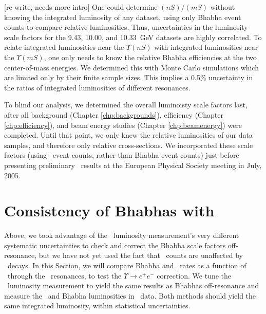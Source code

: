 \documentclass{cornell}
\begin{document}
[re-write, needs more intro] One could determine \gee$(nS)$/\gee$(mS)$
without knowing the integrated luminosity of any dataset, using only
Bhabha event counts to compare relative luminosities.  Thus,
uncertainties in the luminosity scale factors for the 9.43, 10.00, and
10.33~GeV datasets are highly correlated.  To relate integrated
luminosities near the $\Upsilon(nS)$ with integrated luminosities near
the $\Upsilon(mS)$, one only needs to know the relative Bhabha
efficiencies at the two center-of-mass energies.  We determined this
with Monte Carlo simulations which are limited only by their finite
sample sizes.  This implies a 0.5\% uncertainty in the ratios of
integrated luminosities of different resonances.

To blind our analysis, we determined the overall luminoisty scale
factors last, after all background (Chapter \ref{chp:backgrounds}),
efficiency (Chapter \ref{chp:efficiency}), and beam energy studies
(Chapter \ref{chp:beamenergy}) were completed.  Until that point, we
only knew the relative luminosities of our data samples, and therefore
only relative cross-sections.  We incorporated these scale factors
(using \gamgam\ event counts, rather than Bhabha event counts) just
before presenting preliminary \gee\ results at the European Physical
Society meeting in July, 2005.

\section{Consistency of Bhabhas with \boldmath \gamgam}

Above, we took advantage of the \gamgam\ luminosity measurement's very
different systematic uncertainties to check and correct the Bhabha
scale factors off-resonance, but we have not yet used the fact that
\gamgam\ counts are unaffected by \ups\ decays.  In this Section, we
will compare Bhabha and \gamgam\ rates as a function of \ecm\ through
the \ups\ resonances, to test the $\Upsilon \to e^+e^-$ correction.
We tune the \gamgam\ luminosity measurement to yield the same results
as Bhabhas off-resonance and measure the \gamgam\ and Bhabha
luminosities in \ups\ data.  Both methods should yield the same
integrated luminosity, within statistical uncertainties.
\end{document}
